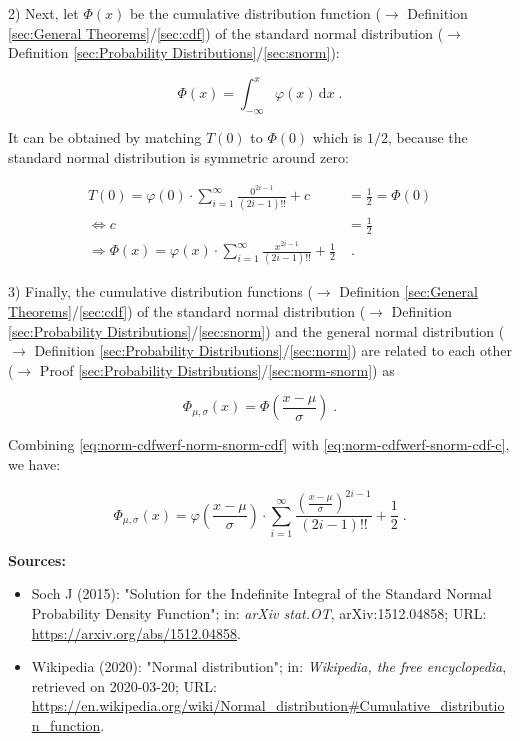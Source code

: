 \documentclass[a4paper,12pt,twoside]{book}
\begin{document}
2) Next, let $\Phi(x)$ be the cumulative distribution function ($\rightarrow$ Definition \ref{sec:General Theorems}/\ref{sec:cdf}) of the standard normal distribution ($\rightarrow$ Definition \ref{sec:Probability Distributions}/\ref{sec:snorm}):

\begin{equation} \label{eq:norm-cdfwerf-snorm-cdf}
\Phi(x) = \int_{-\infty}^x \varphi(x) \, \mathrm{d}x \; .
\end{equation}

It can be obtained by matching $T(0)$ to $\Phi(0)$ which is $1/2$, because the standard normal distribution is symmetric around zero:

\begin{equation} \label{eq:norm-cdfwerf-snorm-cdf-c}
\begin{split}
T(0) = \varphi(0) \cdot \sum_{i=1}^{\infty} \frac{0^{2i-1}}{(2i-1)!!} + c &= \frac{1}{2} = \Phi(0) \\
\Leftrightarrow c &= \frac{1}{2} \\
\Rightarrow \Phi(x) = \varphi(x) \cdot \sum_{i=1}^{\infty} \frac{x^{2i-1}}{(2i-1)!!} + \frac{1}{2} \! &\; .
\end{split}
\end{equation}

3) Finally, the cumulative distribution functions ($\rightarrow$ Definition \ref{sec:General Theorems}/\ref{sec:cdf}) of the standard normal distribution ($\rightarrow$ Definition \ref{sec:Probability Distributions}/\ref{sec:snorm}) and the general normal distribution ($\rightarrow$ Definition \ref{sec:Probability Distributions}/\ref{sec:norm}) are related to each other ($\rightarrow$ Proof \ref{sec:Probability Distributions}/\ref{sec:norm-snorm}) as

\begin{equation} \label{eq:norm-cdfwerf-norm-snorm-cdf}
\Phi_{\mu,\sigma}(x) = \Phi\left( \frac{x-\mu}{\sigma} \right) \; .
\end{equation}

Combining \eqref{eq:norm-cdfwerf-norm-snorm-cdf} with \eqref{eq:norm-cdfwerf-snorm-cdf-c}, we have:

\begin{equation} \label{eq:norm-cdfwerf-norm-cdf-qed}
\Phi_{\mu,\sigma}(x) = \varphi\left( \frac{x-\mu}{\sigma} \right) \cdot \sum_{i=1}^{\infty} \frac{\left( \frac{x-\mu}{\sigma} \right)^{2i-1}}{(2i-1)!!} + \frac{1}{2} \; .
\end{equation}


\vspace{1em}
\textbf{Sources:}
\begin{itemize}
\item Soch J (2015): "Solution for the Indefinite Integral of the Standard Normal Probability Density Function"; in: \textit{arXiv stat.OT}, arXiv:1512.04858; URL: \url{https://arxiv.org/abs/1512.04858}.
\item Wikipedia (2020): "Normal distribution"; in: \textit{Wikipedia, the free encyclopedia}, retrieved on 2020-03-20; URL: \url{https://en.wikipedia.org/wiki/Normal_distribution#Cumulative_distribution_function}.
\end{itemize}
\end{document}
